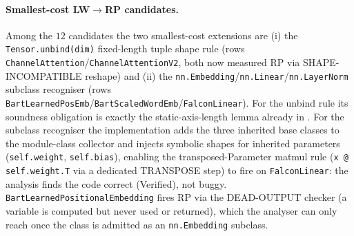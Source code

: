 \paragraph{Smallest-cost LW$\to$RP candidates.}
Among the $12$ candidates the two smallest-cost extensions are (i) the
\texttt{Tensor.unbind(dim)} fixed-length tuple shape rule (rows
\texttt{ChannelAttention}/\texttt{ChannelAttentionV2}, both now measured
RP via \textsc{SHAPE-INCOMPATIBLE} reshape) and (ii) the
\texttt{nn.Embedding}/\texttt{nn.Linear}/\texttt{nn.LayerNorm} subclass
recogniser (rows \texttt{BartLearnedPosEmb}/\texttt{BartScaledWordEmb}/\texttt{FalconLinear}).
For the unbind rule its soundness obligation is exactly the
static-axis-length lemma already in .
For the subclass recogniser the implementation adds the three inherited
base classes to the module-class collector and injects symbolic shapes
for inherited parameters (\texttt{self.weight}, \texttt{self.bias}),
enabling the transposed-Parameter matmul rule
(\texttt{x @ self.weight.T} via a dedicated
\textsc{TRANSPOSE} step) to fire on \texttt{FalconLinear}:
the analysis finds the code correct (Verified), not buggy.
\texttt{BartLearnedPositionalEmbedding} fires RP via the
\textsc{DEAD-OUTPUT} checker (a variable is computed but
never used or returned), which the analyser can only reach
once the class is admitted as an \texttt{nn.Embedding} subclass.

